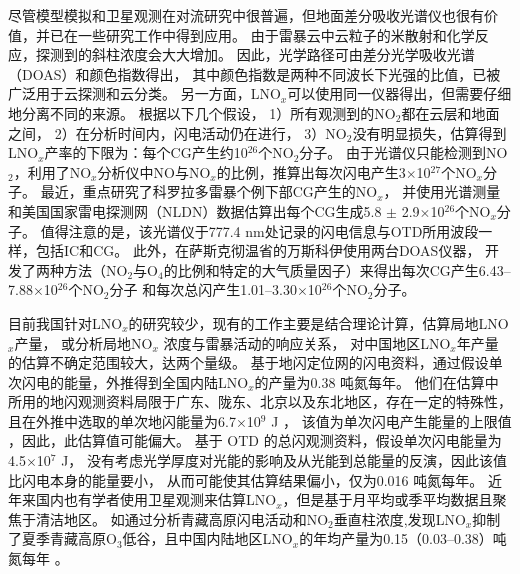 尽管模型模拟和卫星观测在对流研究中很普遍，但地面差分吸收光谱仪也很有价值，并已在一些研究工作中得到应用。
由于雷暴云中云粒子的米散射和化学反应，探测到的斜柱浓度会大大增加\citep{Erle.1995,Pfeilsticker.1998,Winterrath.1999}。
因此，光学路径可由差分光学吸收光谱（DOAS）\citep{Veitel.1998,Wagner.1998}和颜色指数得出，
其中颜色指数是两种不同波长下光强的比值，已被广泛用于云探测和云分类\citep{Wagner.2014,Wang.2015,Wagner.2016}。
另一方面，LNO$_x$可以使用同一仪器得出，但需要仔细地分离不同的来源。
\citet{Noxon.1976}根据以下几个假设，
1）所有观测到的NO$_2$都在云层和地面之间，
2）在分析时间内，闪电活动仍在进行，
3）NO$_2$没有明显损失，估算得到LNO$_x$产率的下限为：每个CG产生约10$^{26}$个NO$_2$分子。
由于光谱仪只能检测到NO$_2$，\citet{Franzblau.1989}利用了NO$_x$分析仪中NO与NO$_x$的比例，推算出每次闪电产生3$\times$10$^{27}$个NO$_x$分子。
最近，\citet{Langford.2004}重点研究了科罗拉多雷暴个例下部CG产生的NO$_x$，
并使用光谱测量和美国国家雷电探测网（NLDN）数据估算出每个CG生成5.8 $\pm$ 2.9$\times$10$^{26}$个NO$_x$分子。
值得注意的是，该光谱仪于777.4 nm处记录的闪电信息与OTD所用波段一样，包括IC和CG。
此外，在萨斯克彻温省的万斯科伊使用两台DOAS仪器，
开发了两种方法（NO$_2$与O$_4$的比例和特定的大气质量因子）来得出每次CG产生6.43--7.88$\times$10$^{26}$个NO$_2$分子
和每次总闪产生1.01--3.30$\times$10$^{26}$个NO$_2$分子\citep{Fraser.2007}。

目前我国针对LNO$_x$的研究较少，现有的工作主要是结合理论计算，估算局地LNO$_x$产量，
或分析局地NO$_x$ 浓度与雷暴活动的响应关系\citep{DuJian.2002,ZhangYiJun.2002,ZhouYunJun.2002}，
对中国地区LNO$_x$年产量的估算不确定范围较大，达两个量级。
\citet{ZhouYunJun.2004}基于地闪定位网的闪电资料，通过假设单次闪电的能量，外推得到全国内陆LNO$_x$的产量为0.38 吨氮每年。
他们在估算中所用的地闪观测资料局限于广东、陇东、北京以及东北地区，存在一定的特殊性，
且在外推中选取的单次地闪能量为6.7$\times$10$^9$ J \citep{Price.1997a,Price.1997b}，
该值为单次闪电产生能量的上限值 \citep{Wang.1998}，因此，此估算值可能偏大。
\citet{SunAnPing.2004}基于 OTD 的总闪观测资料，假设单次闪电能量为4.5$\times$10$^7$ J，
没有考虑光学厚度对光能的影响及从光能到总能量的反演，因此该值比闪电本身的能量要小，
从而可能使其估算结果偏小，仅为0.016 吨氮每年。
近年来国内也有学者使用卫星观测来估算LNO$_x$，但是基于月平均或季平均数据且聚焦于清洁地区。
如通过分析青藏高原闪电活动和NO$_2$垂直柱浓度,发现LNO$_x$抑制了夏季青藏高原O$_3$低谷，且中国内陆地区LNO$_x$的年均产量为0.15（0.03--0.38）吨氮每年 \citep{JuXiaoYu.2015,Guo.2017,GuoFengXia.2019,Li.2022}。


